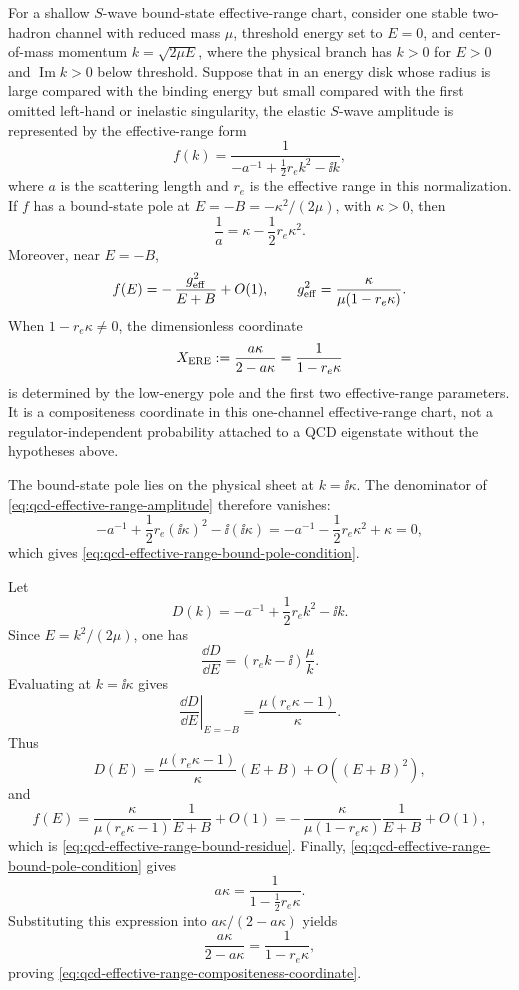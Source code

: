 For a shallow \(S\)-wave bound-state effective-range chart, consider one
stable two-hadron channel with reduced mass \(\mu\), threshold
energy set to \(E=0\), and center-of-mass momentum
\(k=\sqrt{2\mu E}\), where the physical branch has \(k>0\) for \(E>0\) and
\(\operatorname{Im}k>0\) below threshold.  Suppose that in an energy disk
whose radius is large compared with the binding energy but small compared
with the first omitted left-hand or inelastic singularity, the elastic
\(S\)-wave amplitude is represented by the effective-range form
\begin{equation}
  f(k)
  =
  \frac{1}{-a^{-1}+\frac12 r_e k^2-\ii k},
  \label{eq:qcd-effective-range-amplitude}
\end{equation}
where \(a\) is the scattering length and \(r_e\) is the effective range in
this normalization.  If \(f\) has a bound-state pole at
\(E=-B=-\kappa^2/(2\mu)\), with \(\kappa>0\), then
\begin{equation}
  \frac1a=\kappa-\frac12 r_e\kappa^2.
  \label{eq:qcd-effective-range-bound-pole-condition}
\end{equation}
Moreover, near \(E=-B\),
\begin{equation}
  f(E)
  =
  -\,\frac{g_{\rm eff}^2}{E+B}+O(1),
  \qquad
  g_{\rm eff}^2
  =
  \frac{\kappa}{\mu(1-r_e\kappa)}.
  \label{eq:qcd-effective-range-bound-residue}
\end{equation}
When \(1-r_e\kappa\ne0\), the dimensionless coordinate
\begin{equation}
  X_{\rm ERE}
  :=
  \frac{a\kappa}{2-a\kappa}
  =
  \frac{1}{1-r_e\kappa}
  \label{eq:qcd-effective-range-compositeness-coordinate}
\end{equation}
is determined by the low-energy pole and the first two effective-range
parameters.  It is a compositeness coordinate in this one-channel
effective-range chart, not a regulator-independent probability attached to a
QCD eigenstate without the hypotheses above.

The bound-state pole lies on the physical sheet at \(k=\ii\kappa\).  The
denominator of \eqref{eq:qcd-effective-range-amplitude} therefore vanishes:
\[
  -a^{-1}
  +\frac12 r_e(\ii\kappa)^2
  -\ii(\ii\kappa)
  =
  -a^{-1}-\frac12 r_e\kappa^2+\kappa=0,
\]
which gives \eqref{eq:qcd-effective-range-bound-pole-condition}.

Let
\[
  D(k)=-a^{-1}+\frac12 r_e k^2-\ii k.
\]
Since \(E=k^2/(2\mu)\), one has
\[
  \frac{\dd D}{\dd E}
  =
  (r_e k-\ii)\frac{\mu}{k}.
\]
Evaluating at \(k=\ii\kappa\) gives
\[
  \left.\frac{\dd D}{\dd E}\right|_{E=-B}
  =
  \frac{\mu(r_e\kappa-1)}{\kappa}.
\]
Thus
\[
  D(E)=\frac{\mu(r_e\kappa-1)}{\kappa}(E+B)+O((E+B)^2),
\]
and
\[
  f(E)=
  \frac{\kappa}{\mu(r_e\kappa-1)}\frac1{E+B}+O(1)
  =
  -\,\frac{\kappa}{\mu(1-r_e\kappa)}\frac1{E+B}+O(1),
\]
which is \eqref{eq:qcd-effective-range-bound-residue}.  Finally,
\eqref{eq:qcd-effective-range-bound-pole-condition} gives
\[
  a\kappa=\frac{1}{1-\frac12 r_e\kappa}.
\]
Substituting this expression into \(a\kappa/(2-a\kappa)\) yields
\[
  \frac{a\kappa}{2-a\kappa}
  =
  \frac{1}{1-r_e\kappa},
\]
proving \eqref{eq:qcd-effective-range-compositeness-coordinate}.

